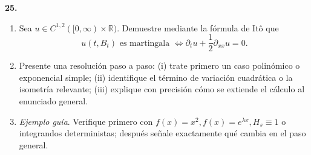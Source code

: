 \documentclass[11pt, letterpaper]{article}
\begin{document}
\newpage


\begin{ejercicio}
    \textbf{25.} 
    \begin{enumerate}
        \item Sea $u \in C^{1,2}([0, \infty) \times \mathbb{R})$. Demuestre mediante la fórmula de Itô que
        \[ u(t, B_t) \text{ es martingala } \iff \partial_t u + \frac{1}{2}\partial_{xx} u = 0. \]
        \item Presente una resolución paso a paso: (i) trate primero un caso polinómico o exponencial simple; (ii) identifique el término de variación cuadrática o la isometría relevante; (iii) explique con precisión cómo se extiende el cálculo al enunciado general.
        \item \textit{Ejemplo guía}. Verifique primero con $f(x) = x^2, f(x) = e^{\lambda x}, H_s \equiv 1$ o integrandos deterministas; después señale exactamente qué cambia en el paso general.
    \end{enumerate}
\end{ejercicio}

\vspace{5mm}
\end{document}
